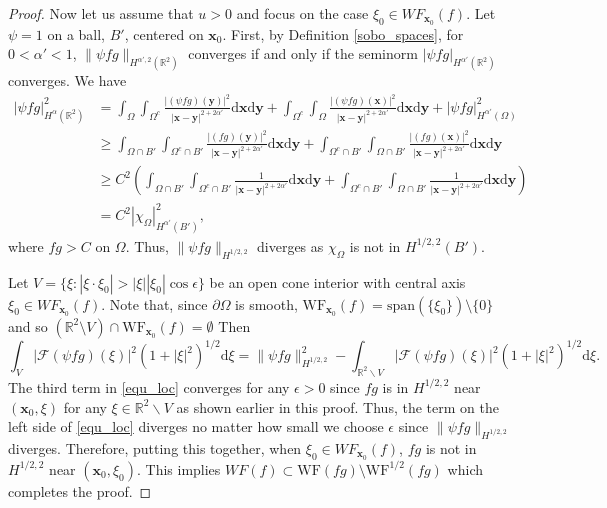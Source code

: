 \documentclass[a4paper,12pt]{amsart}
\numberwithin{equation}{section}
\theoremstyle{plain}
\numberwithin{theorem}{section}
\theoremstyle{definition}
\theoremstyle{remark}
\theoremstyle{remark}
\theoremstyle{remark}
\newcommand{\paren}[1]{\left(#1\right)}               %
\newcommand{\tred}[1]{{\color{red}#1}}
\newcommand{\WF}{\mathrm{WF}}                         %
\newcommand{\vx}{{\mathbf{x}}}
\newcommand{\vy}{{\mathbf{y}}}
\newcommand{\jc}[1]{\begin{quotation}\textbf{James' comment:\
}{\textit{#1}}\end{quotation}}
\newcommand{\seanc}[1]{\begin{quotation}\textbf{Sean's comment:\
}{\textit{#1}}\end{quotation}}
\begin{document}
\begin{proof}
Now let us assume that $u>0$ and focus on the case $\xi_0 \in WF_{\vx_0}(f)$. Let $\psi = 1$ on a ball, $B'$, centered on $\vx_0$. First, by Definition \ref{sobo_spaces}, for $0<\alpha'<1$, $\|\psi fg\|_{H^{\alpha',2}(\mathbb{R}^2)}$ converges if and only if the seminorm $|\psi fg|_{H^{\alpha'}(\mathbb{R}^2)}$ converges. We have
\begin{equation}
\begin{split}
|\psi fg|^2_{H^{\alpha}(\mathbb{R}^2)} &= \int_\Omega\int_{\Omega^c} \frac{|(\psi fg)(\vy)|^2}{|\vx-\vy|^{2 + 2\alpha'}}\mathrm{d}\vx\mathrm{d}\vy  + \int_{\Omega^c}\int_{\Omega} \frac{|(\psi fg)(\vx)|^2}{|\vx-\vy|^{2 + 2\alpha'}}\mathrm{d}\vx\mathrm{d}\vy + |\psi fg|^2_{H^{\alpha'}(\Omega)} \\
&\geq \int_{\Omega\cap B'}\int_{\Omega^c\cap B'} \frac{|(fg)(\vy)|^2}{|\vx-\vy|^{2 + 2\alpha'}}\mathrm{d}\vx\mathrm{d}\vy + \int_{\Omega^c\cap B'}\int_{\Omega\cap B'} \frac{|(fg)(\vx)|^2}{|\vx-\vy|^{2 + 2\alpha'}}\mathrm{d}\vx\mathrm{d}\vy\\
&\geq C^2 \paren{ \int_{\Omega\cap B'}\int_{\Omega^c\cap B'} \frac{1}{|\vx-\vy|^{2 + 2\alpha'}}\mathrm{d}\vx\mathrm{d}\vy + \int_{\Omega^c\cap B'}\int_{\Omega\cap B'} \frac{1}{|\vx-\vy|^{2 + 2\alpha'}}\mathrm{d}\vx\mathrm{d}\vy }\\
&= C^2 |\chi_{\Omega}|^2_{H^{\alpha'}(B')},
\end{split}
\end{equation}
where $fg > C$ on $\Omega$. Thus, $\|\psi fg\|_{H^{1/2,2}}$ diverges as $\chi_\Omega$ is not in $H^{1/2,2}(B')$. 

Let $V = \{\xi : |\xi\cdot \xi_0| > |\xi||\xi_0|\cos\epsilon\}$ be an open cone interior with central axis $\xi_0 \in WF_{\vx_0}(f)$. Note that, since $\partial \Omega$ is smooth, $\WF_{\vx_0}(f) = \mathrm{span}(\{\xi_0\})\setminus \{0\}$ and so $(\mathbb{R}^2 \setminus V) \cap \WF_{\vx_0}(f) = \emptyset$ Then 
\begin{equation}\label{equ_loc}
\int_V |\mathcal{F}(\psi fg)(\xi)|^2(1+|\xi|^2)^{1/2} \mathrm{d}\xi= \|\psi fg\|^2_{H^{1/2,2}} - \int_{\mathbb{R}^2\backslash V} |\mathcal{F}(\psi fg)(\xi)|^2(1+|\xi|^2)^{1/2}\mathrm{d}\xi.
\end{equation}
The third term in \eqref{equ_loc} converges for any $\epsilon > 0$ since $fg$ is in $H^{1/2,2}$ near $(\vx_0, \xi)$ for any $\xi \in \mathbb{R}^2\backslash V$ as shown earlier in this proof. Thus, the term on the left side of \eqref{equ_loc} diverges no matter how small we choose $\epsilon$ since $\|\psi fg\|_{H^{1/2,2}}$ diverges. Therefore, putting this together, when $\xi_0 \in WF_{\vx_0}(f)$, $fg$ is not in $H^{1/2,2}$ near $(\vx_0,\xi_0)$. This implies $WF(f) \subset \WF(fg)\setminus \WF^{1/2}(fg)$ which completes the proof.
\end{proof}
\end{document}
